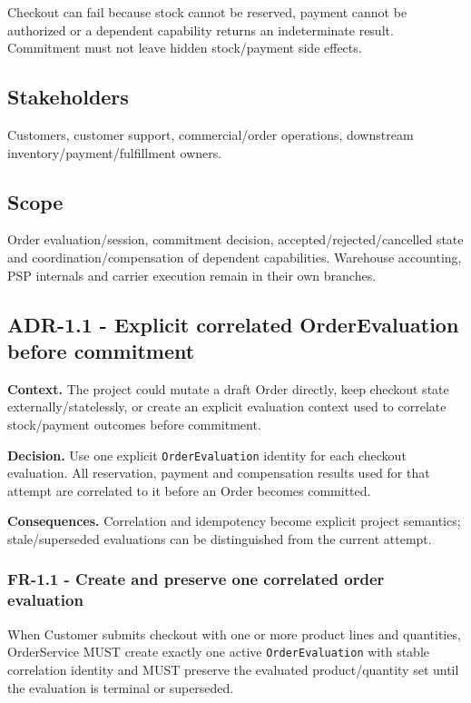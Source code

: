 \documentclass[
  10pt,
]{article}
\begin{document}
Checkout can fail because stock cannot be reserved, payment cannot be
authorized or a dependent capability returns an indeterminate result.
Commitment must not leave hidden stock/payment side effects.

\subsection{Stakeholders}\label{stakeholders}

Customers, customer support, commercial/order operations, downstream
inventory/payment/fulfillment owners.

\subsection{Scope}\label{scope}

Order evaluation/session, commitment decision,
accepted/rejected/cancelled state and coordination/compensation of
dependent capabilities. Warehouse accounting, PSP internals and carrier
execution remain in their own branches.

\subsection{ADR-1.1 - Explicit correlated OrderEvaluation before
commitment}\label{adr-11---explicit-correlated-orderevaluation-before-commitment}

\textbf{Context.} The project could mutate a draft Order directly, keep
checkout state externally/statelessly, or create an explicit evaluation
context used to correlate stock/payment outcomes before commitment.

\textbf{Decision.} Use one explicit \texttt{OrderEvaluation} identity
for each checkout evaluation. All reservation, payment and compensation
results used for that attempt are correlated to it before an Order
becomes committed.

\textbf{Consequences.} Correlation and idempotency become explicit
project semantics; stale/superseded evaluations can be distinguished
from the current attempt.

\subsubsection{FR-1.1 - Create and preserve one correlated order
evaluation}\label{fr-11---create-and-preserve-one-correlated-order-evaluation}

When Customer submits checkout with one or more product lines and
quantities, OrderService MUST create exactly one active
\texttt{OrderEvaluation} with stable correlation identity and MUST
preserve the evaluated product/quantity set until the evaluation is
terminal or superseded.
\end{document}
